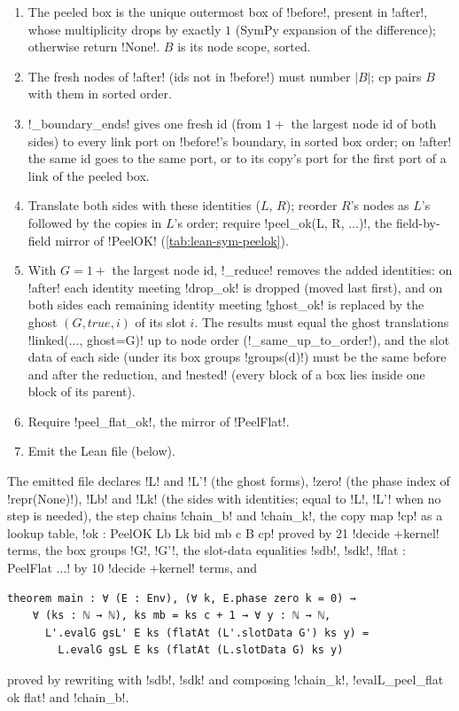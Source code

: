 \begin{algorithm}\label{alg:lean-sym-export-peel}
\begin{enumerate}
\item The peeled box is the unique outermost box of \py!before!, present in \py!after!, whose multiplicity drops by exactly $1$ (SymPy expansion of the difference); otherwise return \py!None!. $B$ is its node scope, sorted.
\item The fresh nodes of \py!after! (ids not in \py!before!) must number $|B|$; $\mathrm{cp}$ pairs $B$ with them in sorted order.
\item \py!_boundary_ends! gives one fresh id (from $1+$ the largest node id of both sides) to every link port on \py!before!'s boundary, in sorted box order; on \py!after! the same id goes to the same port, or to its copy's port for the first port of a link of the peeled box.
\item Translate both sides with these identities ($L$, $R$); reorder $R$'s nodes as $L$'s followed by the copies in $L$'s order; require \py!peel_ok(L, R, ...)!, the field-by-field mirror of \lean!PeelOK! (\cref{tab:lean-sym-peelok}).
\item With $G=1+$ the largest node id, \py!_reduce! removes the added identities: on \py!after! each identity meeting \py!drop_ok! is dropped (moved last first), and on both sides each remaining identity meeting \py!ghost_ok! is replaced by the ghost $(G,\mathit{true},i)$ of its slot $i$. The results must equal the ghost translations \py!linked(..., ghost=G)! up to node order (\py!_same_up_to_order!), and the slot data of each side (under its box groups \py!groups(d)!) must be the same before and after the reduction, and \py!nested! (every block of a box lies inside one block of its parent).
\item Require \py!peel_flat_ok!, the mirror of \lean!PeelFlat!.
\item Emit the Lean file (below).
\end{enumerate}
\end{algorithm}

The emitted file declares \lean!L! and \lean!L'! (the ghost forms), \lean!zero! (the phase index of \py!repr(None)!), \lean!Lb! and \lean!Lk! (the sides with identities; equal to \lean!L!, \lean!L'! when no step is needed), the step chains \lean!chain_b! and \lean!chain_k!, the copy map \lean!cp! as a lookup table, \lean!ok : PeelOK Lb Lk bid mb c B cp! proved by 21 \lean!decide +kernel! terms, the box groups \lean!G!, \lean!G'!, the slot-data equalities \lean!sdb!, \lean!sdk!, \lean!flat : PeelFlat ...! by 10 \lean!decide +kernel! terms, and
\begin{lstlisting}[style=lean]
theorem main : ∀ (E : Env), (∀ k, E.phase zero k = 0) →
    ∀ (ks : ℕ → ℕ), ks mb = ks c + 1 → ∀ y : ℕ → ℕ,
      L'.evalG gsL' E ks (flatAt (L'.slotData G') ks y) =
        L.evalG gsL E ks (flatAt (L.slotData G) ks y)
\end{lstlisting}
proved by rewriting with \lean!sdb!, \lean!sdk! and composing \lean!chain_k!, \lean!evalL_peel_flat ok flat! and \lean!chain_b!.

